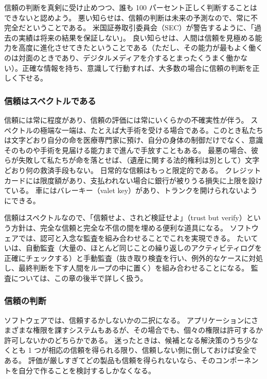 \documentclass[uplatex]{jsarticle}
\begin{document}
信頼の判断を真剣に受け止めつつ、誰も 100 パーセント正しく判断することはできないと認めよう。
悪い知らせは、信頼の判断は未来の予測なので、常に不完全だということである。
米国証券取引委員会（SEC）が警告するように、「過去の実績は将来の結果を保証しない」。
良い知らせは、人間は信頼を見極める能力を高度に進化させてきたということである（ただし、その能力が最もよく働くのは対面のときであり、デジタルメディアを介するとまったくうまく働かない）。正確な情報を持ち、意識して行動すれば、大多数の場合に信頼の判断を正しく下せる。

\subsubsection{信頼はスペクトルである}

信頼には常に程度があり、信頼の評価には常にいくらかの不確実性が伴う。
スペクトルの極端な一端は、たとえば大手術を受ける場合である。このとき私たちは文字どおり自分の命を医療専門家に預け、自分の身体の制御だけでなく、意識そのものや手術を見届ける能力まで進んで手放すこともある。
最悪の場合、彼らが失敗して私たちが命を落とせば、（遺産に関する法的権利は別として）文字どおり何の救済手段もない。
日常的な信頼はもっと限定的である。
クレジットカードには限度額があり、支払われない場合に銀行が被りうる損失に上限を設けている。
車にはバレーキー（valet key）があり、トランクを開けられないようにできる。

信頼はスペクトルなので、「信頼せよ、されど検証せよ」（trust but verify）という方針は、完全な信頼と完全な不信の間を埋める便利な道具になる。
ソフトウェアでは、認可と入念な監査を組み合わせることでこれを実現できる。
たいていは、自動監査（大量の、ほとんど同じことの繰り返しのアクティビティログを正確にチェックする）と手動監査（抜き取り検査を行い、例外的なケースに対処し、最終判断を下す人間をループの中に置く）を組み合わせることになる。
監査については、この章の後半で詳しく扱う。

\subsubsection{信頼の判断}

ソフトウェアでは、信頼するかしないかの二択になる。
アプリケーションにさまざまな権限を課すシステムもあるが、その場合でも、個々の権限は許可するか許可しないかのどちらかである。
迷ったときは、候補となる解決策のうち少なくとも 1 つが相応の信頼を得られる限り、信頼しない側に倒しておけば安全である。
評価が厳しすぎてどの製品も信頼を得られないなら、そのコンポーネントを自分で作ることを検討するしかなくなる。
\end{document}
